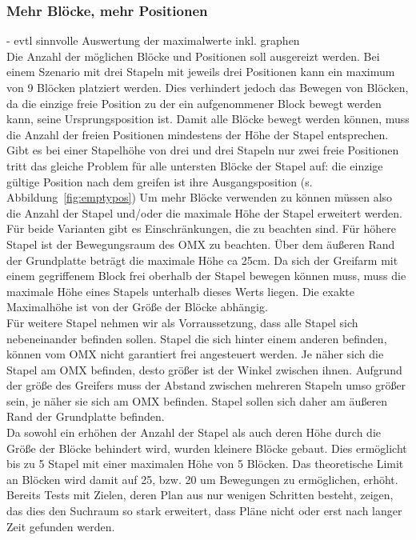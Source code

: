 \subsubsection{Mehr Blöcke, mehr Positionen}
\newpage
- evtl sinnvolle Auswertung der maximalwerte inkl. graphen\\
Die Anzahl der möglichen Blöcke und Positionen soll ausgereizt werden.
Bei einem Szenario mit drei Stapeln mit jeweils drei Positionen kann ein maximum von 9 Blöcken platziert werden.
Dies verhindert jedoch das Bewegen von Blöcken, da die einzige freie Position zu der ein aufgenommener Block bewegt werden kann, seine Ursprungsposition ist.
Damit alle Blöcke bewegt werden können, muss die Anzahl der freien Positionen mindestens der Höhe der Stapel entsprechen.
Gibt es bei einer Stapelhöhe von drei und drei Stapeln nur zwei freie Positionen tritt das gleiche Problem für alle untersten Blöcke der Stapel auf: die einzige gültige Position nach dem greifen ist ihre Ausgangsposition (s. Abbildung~\ref{fig:emptypos})
Um mehr Blöcke verwenden zu können müssen also die Anzahl der Stapel und/oder die maximale Höhe der Stapel erweitert werden.\\
Für beide Varianten gibt es Einschränkungen, die zu beachten sind.
Für höhere Stapel ist der Bewegungsraum des OMX zu beachten.
Über dem äußeren Rand der Grundplatte beträgt die maximale Höhe ca 25cm.
Da sich der Greifarm mit einem gegriffenem Block frei oberhalb der Stapel bewegen können muss, muss die maximale Höhe eines Stapels unterhalb dieses Werts liegen.
Die exakte Maximalhöhe ist von der Größe der Blöcke abhängig.\\
Für weitere Stapel nehmen wir als Vorraussetzung, dass alle Stapel sich nebeneinander befinden sollen.
Stapel die sich hinter einem anderen befinden, können vom OMX nicht garantiert frei angesteuert werden.
Je näher sich die Stapel am OMX befinden, desto größer ist der Winkel zwischen ihnen.
Aufgrund der größe des Greifers muss der Abstand zwischen mehreren Stapeln umso größer sein, je näher sie sich am OMX befinden.
Stapel sollen sich daher am äußeren Rand der Grundplatte befinden.\\
Da sowohl ein erhöhen der Anzahl der Stapel als auch deren Höhe durch die Größe der Blöcke behindert wird, wurden kleinere Blöcke gebaut.
Dies ermöglicht bis zu 5 Stapel mit einer maximalen Höhe von 5 Blöcken.
Das theoretische Limit an Blöcken wird damit auf 25, bzw. 20 um Bewegungen zu ermöglichen, erhöht.\\
Bereits Tests mit Zielen, deren Plan aus nur wenigen Schritten besteht, zeigen, das dies den Suchraum so stark erweitert, dass Pläne nicht oder erst nach langer Zeit gefunden werden.

